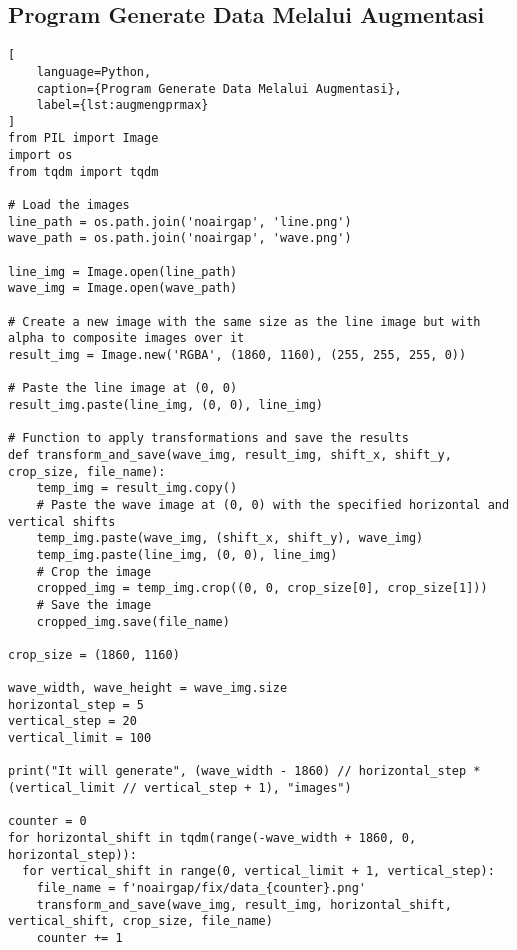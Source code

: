\subsection*{Program Generate Data Melalui Augmentasi}
\begin{lstlisting}[
    language=Python,
    caption={Program Generate Data Melalui Augmentasi},
    label={lst:augmengprmax}
]
from PIL import Image
import os
from tqdm import tqdm

# Load the images
line_path = os.path.join('noairgap', 'line.png')
wave_path = os.path.join('noairgap', 'wave.png')

line_img = Image.open(line_path)
wave_img = Image.open(wave_path)

# Create a new image with the same size as the line image but with alpha to composite images over it
result_img = Image.new('RGBA', (1860, 1160), (255, 255, 255, 0))

# Paste the line image at (0, 0)
result_img.paste(line_img, (0, 0), line_img)

# Function to apply transformations and save the results
def transform_and_save(wave_img, result_img, shift_x, shift_y, crop_size, file_name):
    temp_img = result_img.copy()
    # Paste the wave image at (0, 0) with the specified horizontal and vertical shifts
    temp_img.paste(wave_img, (shift_x, shift_y), wave_img)
    temp_img.paste(line_img, (0, 0), line_img)
    # Crop the image
    cropped_img = temp_img.crop((0, 0, crop_size[0], crop_size[1]))
    # Save the image
    cropped_img.save(file_name)

crop_size = (1860, 1160)

wave_width, wave_height = wave_img.size
horizontal_step = 5
vertical_step = 20
vertical_limit = 100

print("It will generate", (wave_width - 1860) // horizontal_step * (vertical_limit // vertical_step + 1), "images")

counter = 0
for horizontal_shift in tqdm(range(-wave_width + 1860, 0, horizontal_step)):
  for vertical_shift in range(0, vertical_limit + 1, vertical_step):
    file_name = f'noairgap/fix/data_{counter}.png'
    transform_and_save(wave_img, result_img, horizontal_shift, vertical_shift, crop_size, file_name)
    counter += 1
\end{lstlisting}

